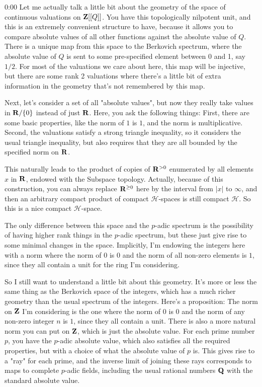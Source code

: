 \begin{unfinished}{0:00}
Let me actually talk a little bit about the geometry of the space of continuous valuations on $\mathbf Z[[Q]]$. You have this topologically nilpotent unit, and this is an extremely convenient structure to have, because it allows you to compare absolute values of all other functions against the absolute value of $Q$. There is a unique map from this space to the Berkovich spectrum, where the absolute value of $Q$ is sent to some pre-specified element between 0 and 1, say $1/2$. For most of the valuations we care about here, this map will be injective, but there are some rank 2 valuations where there's a little bit of extra information in the geometry that's not remembered by this map.

Next, let's consider a set of all "absolute values", but now they really take values in $\mathbf R/\{0\}$ instead of just $\mathbf R$. Here, you ask the following things: First, there are some basic properties, like the norm of $1$ is $1$, and the norm is multiplicative. Second, the valuations satisfy a strong triangle inequality, so it considers the usual triangle inequality, but also requires that they are all bounded by the specified norm on $\mathbf R$. 

This naturally leads to the product of copies of $\mathbf R^{>0}$ enumerated by all elements $x$ in $\mathbf R$, endowed with the Subspace topology. Actually, because of this construction, you can always replace $\mathbf R^{\ge0}$ here by the interval from $|x|$ to $\infty$, and then an arbitrary compact product of compact $\mathcal{H}$-spaces is still compact $\mathcal{H}$. So this is a nice compact $\mathcal{H}$-space.

The only difference between this space and the $p$-adic spectrum is the possibility of having higher rank things in the $p$-adic spectrum, but these just give rise to some minimal changes in the space. Implicitly, I'm endowing the integers here with a norm where the norm of $0$ is $0$ and the norm of all non-zero elements is $1$, since they all contain a unit for the ring I'm considering.

So I still want to understand a little bit about this geometry. It's more or less the same thing as the Berkovich space of the integers, which has a much richer geometry than the usual spectrum of the integers. Here's a proposition: The norm on $\mathbf Z$ I'm considering is the one where the norm of $0$ is $0$ and the norm of any non-zero integer $n$ is $1$, since they all contain a unit. There is also a more natural norm you can put on $\mathbf Z$, which is just the absolute value. For each prime number $p$, you have the $p$-adic absolute value, which also satisfies all the required properties, but with a choice of what the absolute value of $p$ is. This gives rise to a "ray" for each prime, and the inverse limit of joining these rays corresponds to maps to complete $p$-adic fields, including the usual rational numbers $\mathbf Q$ with the standard absolute value.


\end{unfinished}
